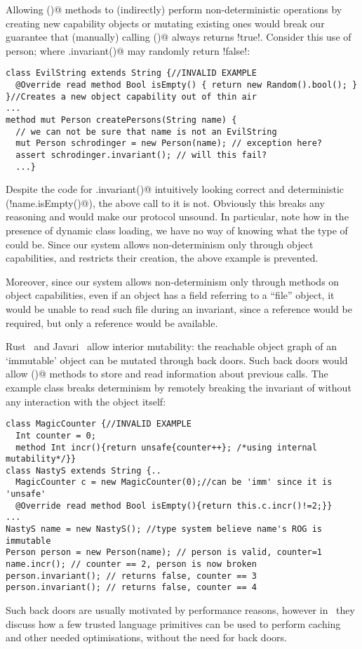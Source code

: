 Allowing \Q@invariant()@ methods to (indirectly) perform non-deterministic operations by creating new capability objects or mutating existing ones would break our guarantee that (manually) calling \Q@invariant()@ always returns \Q!true!.
Consider this use of person; where \Q@myPerson.invariant()@ may randomly return \Q!false!:
\begin{lstlisting}[morekeywords={assert}]
class EvilString extends String {//INVALID EXAMPLE
  @Override read method Bool isEmpty() { return new Random().bool(); }
}//Creates a new object capability out of thin air
...
method mut Person createPersons(String name) {
  // we can not be sure that name is not an EvilString
  mut Person schrodinger = new Person(name); // exception here?
  assert schrodinger.invariant(); // will this fail?
  ...}
\end{lstlisting}
Despite the code for \Q@Person.invariant()@ intuitively looking correct and deterministic (\Q@!name.isEmpty()@), the above call to it is not. Obviously this breaks any reasoning and would make our protocol unsound. 
In particular, note how in the presence of dynamic class loading, we have no way of knowing what the type of \Q@name@ could be. Since our system allows non-determinism only through object capabilities, and 
restricts their creation, the above example is prevented.

Moreover, since our system allows  
non-determinism only through \Q@mut@ methods on object capabilities, 
even if an object has a \Q@rep@ field referring to a ``file'' object, it would be unable to read such file during an invariant, since a \Q@mut@ reference would be required, but only a \Q@read@ reference would be available.

Rust~\cite{matsakis2014rust} and Javari~\cite{TschantzErnst05}
allow interior mutability:
the reachable object graph of an `immutable' object can be mutated through back doors.
Such back doors would allow \Q@invariant()@ methods to store and read information about previous calls.
The example class \Q@MagicCounter@ breaks determinism by
remotely breaking the invariant of \Q@person@ without any interaction with the \Q@person@ object itself:
\begin{lstlisting}
class MagicCounter {//INVALID EXAMPLE
  Int counter = 0;
  method Int incr(){return unsafe{counter++}; /*using internal mutability*/}}
class NastyS extends String {..
  MagicCounter c = new MagicCounter(0);//can be 'imm' since it is 'unsafe'
  @Override read method Bool isEmpty(){return this.c.incr()!=2;}}
...
NastyS name = new NastyS(); //type system believe name's ROG is immutable
Person person = new Person(name); // person is valid, counter=1
name.incr(); // counter == 2, person is now broken
person.invariant(); // returns false, counter == 3
person.invariant(); // returns false, counter == 4
\end{lstlisting}
Such back doors are usually motivated by performance reasons, however in~\cite{GordonEtAl12} they
discuss how a few trusted language primitives can be used to perform caching and other needed optimisations,
without the need for back doors.


